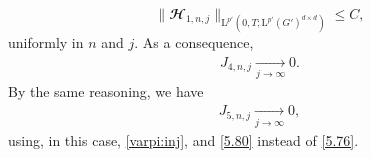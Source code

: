 \documentclass[12pt,reqno]{amsart}
\numberwithin{equation}{section}
\theoremstyle{definition}
\def\L{\mathrm{L}}
\def\bcH{\mathbfcal{H}}
\begin{document}
{{{\begin{equation*}
\|\bcH_{1,n,j}\|_{\L^{p'}(0,T; \L^{p'}(G')^{d\times d})} \leq C,
\end{equation*}
uniformly in $n$ and $j$.
As a consequence,
\begin{equation}\label{est:J4:n:j}
\begin{split}
J_{4,n,j} \xrightarrow[j\to\infty]{} 0.
\end{split}
\end{equation}
By the same reasoning, we have
\begin{equation}\label{est:J5:n:j}
\begin{split}
J_{5,n,j} \xrightarrow[j\to\infty]{} 0,
\end{split}
\end{equation}
using, in this case, \eqref{varpi:inj}, and \eqref{5.80} instead of \eqref{5.76}.

}}}
\end{document}

